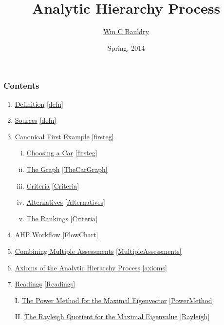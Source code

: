 \documentclass[10pt,handout,hyperref={colorlinks=true,linkcolor=blue,citecolor=citelink,urlcolor=gray}]{beamer}
\title{Analytic Hierarchy Process}
\author{\href{http://www.mathsci.appstate.edu/~wmcb/}{Wm C Bauldry}}
\institute{MAT 4340/5340}
\date{Spring, 2014}
\newcounter{e_temp}
\newcommand{\CL}[2]{\hyperlink{#1}{#2} \dotfill \ref{#1}} %
\begin{document}
\graphicspath{{Images/}}
\logo{}
\begin{frame}
	\titlepage
\end{frame}

\begin{frame}
\frametitle{Contents}
\begin{enumerate}
\setlength{\itemsep}{1ex}
\item \CL{defn}{Definition}
\item \CL{defn}{Sources}
\item \CL{firsteg}{Canonical First Example} \\[-0.5ex]
	\begin{enumerate}[i.]
	\item \CL{firsteg}{Choosing a Car}
	\item \CL{TheCarGraph}{The Graph}
	\item \CL{Criteria}{Criteria}
	\item \CL{Alternatives}{Alternatives}
	\item \CL{Criteria}{The Rankings}
	\end{enumerate}
\item \CL{FlowChart}{AHP Workflow}
\item \CL{MultipleAssessments}{Combining Multiple Assessments}
\item \CL{axioms}{Axioms of the Analytic Hierarchy Process}
\item \CL{Readings}{Readings}
\end{enumerate}
\vspace{3ex}

\begin{itemize}
\item[I.] \CL{PowerMethod}{The Power Method for the Maximal Eigenvector}
\item[II.] \CL{Rayleigh}{The Rayleigh Quotient for the Maximal Eigenvalue}
\end{itemize}

\end{frame}

\addtocounter{framenumber}{-2}
\end{document}
